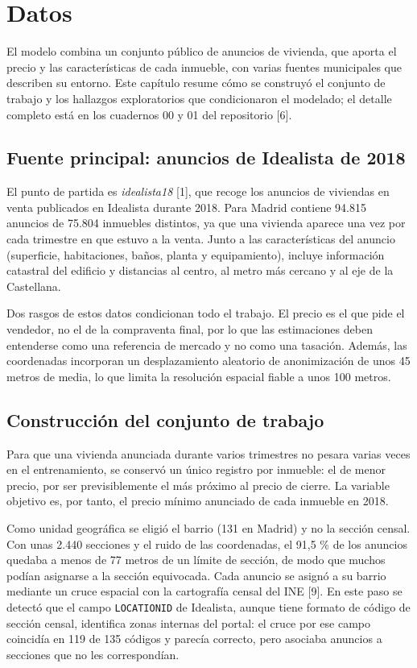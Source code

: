 \documentclass[11pt,a4paper]{article}
\begin{document}
\section{Datos}

El modelo combina un conjunto público de anuncios de vivienda, que aporta el precio y las características de cada inmueble, con varias fuentes municipales que describen su entorno. Este capítulo resume cómo se construyó el conjunto de trabajo y los hallazgos exploratorios que condicionaron el modelado; el detalle completo está en los cuadernos 00 y 01 del repositorio [6].

\subsection{Fuente principal: anuncios de Idealista de 2018}

El punto de partida es \emph{idealista18} [1], que recoge los anuncios de viviendas en venta publicados en Idealista durante 2018. Para Madrid contiene 94.815 anuncios de 75.804 inmuebles distintos, ya que una vivienda aparece una vez por cada trimestre en que estuvo a la venta. Junto a las características del anuncio (superficie, habitaciones, baños, planta y equipamiento), incluye información catastral del edificio y distancias al centro, al metro más cercano y al eje de la Castellana.

Dos rasgos de estos datos condicionan todo el trabajo. El precio es el que pide el vendedor, no el de la compraventa final, por lo que las estimaciones deben entenderse como una referencia de mercado y no como una tasación. Además, las coordenadas incorporan un desplazamiento aleatorio de anonimización de unos 45 metros de media, lo que limita la resolución espacial fiable a unos 100 metros.

\subsection{Construcción del conjunto de trabajo}

Para que una vivienda anunciada durante varios trimestres no pesara varias veces en el entrenamiento, se conservó un único registro por inmueble: el de menor precio, por ser previsiblemente el más próximo al precio de cierre. La variable objetivo es, por tanto, el precio mínimo anunciado de cada inmueble en 2018.

Como unidad geográfica se eligió el barrio (131 en Madrid) y no la sección censal. Con unas 2.440 secciones y el ruido de las coordenadas, el 91,5 \% de los anuncios quedaba a menos de 77 metros de un límite de sección, de modo que muchos podían asignarse a la sección equivocada. Cada anuncio se asignó a su barrio mediante un cruce espacial con la cartografía censal del INE [9]. En este paso se detectó que el campo \texttt{LOCATIONID} de Idealista, aunque tiene formato de código de sección censal, identifica zonas internas del portal: el cruce por ese campo coincidía en 119 de 135 códigos y parecía correcto, pero asociaba anuncios a secciones que no les correspondían.
\end{document}
